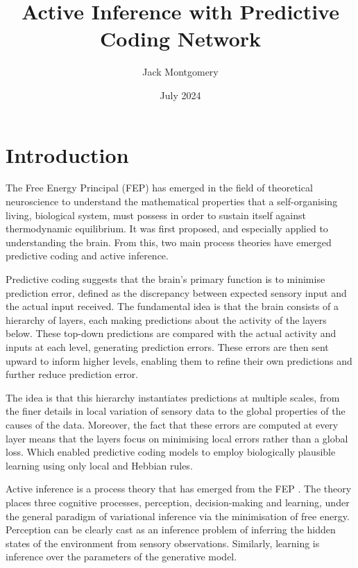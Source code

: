 \documentclass{article}
\title{Active Inference with Predictive Coding Network}
\author{Jack Montgomery}
\date{July 2024}
\begin{document}
\maketitle

\section{Introduction}

The Free Energy Principal (FEP) \citep{friston2006free} has emerged in the field of theoretical neuroscience to understand the mathematical properties that a self-organising living, biological system, must possess in order to sustain itself against thermodynamic equilibrium. It was first proposed, and especially applied to understanding the brain. From this, two main process theories have emerged predictive coding and active inference. 

\vspace{1em}

Predictive coding suggests that the brain's primary function is to minimise prediction error, defined as the discrepancy between expected sensory input and the actual input received. The fundamental idea is that the brain consists of a hierarchy of layers, each making predictions about the activity of the layers below. \citep{friston2008hierarchical} These top-down predictions are compared with the actual activity and inputs at each level, generating prediction errors. These errors are then sent upward to inform higher levels, enabling them to refine their own predictions and further reduce prediction error.

The idea is that this hierarchy instantiates predictions at multiple scales, from the finer details in local variation of sensory data to the global properties of the causes of the data. Moreover, the fact that these errors are computed at every layer means that the layers focus on minimising local errors rather than a global loss. \citep{millidge2021applications} Which enabled predictive coding models to employ biologically plausible learning using only local and Hebbian rules. \citep{whittington2017approximation} 

\vspace{1em}

Active inference is a process theory that has emerged from the FEP \citep{friston2012active, friston2017active}. The theory places three cognitive processes, perception, decision-making and learning, under the general paradigm of variational inference via the minimisation of free energy. Perception can be clearly cast as an inference problem of inferring the hidden states of the environment from sensory observations. Similarly, learning is inference over the parameters of the generative model.
\end{document}
